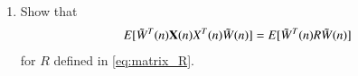 \documentclass[journal,12pt,twocolumn]{IEEEtran}
\renewcommand\thesection{\arabic{section}}
\renewcommand\thesubsection{\thesection.\arabic{subsection}}
\begin{document}
\begin{enumerate}[label=\thesubsection.\arabic*
,ref=\thesubsection.\theenumi]


\item
Show that 
\begin{equation}
E[\tilde W^{T}(n)\mathbf{X}(n) X^{T}(n) \tilde W(n)] = E[\tilde W^{T}(n) R \tilde W(n)]
\end{equation}
%
for $R$ defined in \eqref{eq:matrix_R}.



\end{enumerate}
\end{document}
